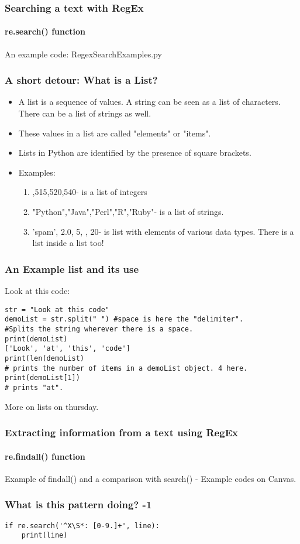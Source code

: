 \documentclass{beamer}
\begin{document}
\begin{frame}
\frametitle{Searching a text with RegEx}
\framesubtitle{re.search() function}
An example code: RegexSearchExamples.py 
\end{frame}

\begin{frame}
\frametitle{A short detour: What is a List?}
\begin{itemize}
\item A list is a sequence of values. A string can be seen as a list of characters. There can be a list of strings as well.
\item These values in a list are called "elements" or "items".
\item Lists in Python are identified by the presence of square brackets. 
\item Examples:
\begin{enumerate}
\item {},515,520,540\rbrack - is a list of integers
\item \lbrack"Python","Java","Perl","R","Ruby"\rbrack - is a list of strings.
\item \lbrack'spam', 2.0, 5, , 20\rbrack\rbrack - is list with elements of various data types. There is a list inside a list too!
\end{enumerate}
\end{itemize}
\end{frame}

\begin{frame}[fragile]
\frametitle{An Example list and its use}
Look at this code:
\begin{verbatim}
str = "Look at this code"
demoList = str.split(" ") #space is here the "delimiter".
#Splits the string wherever there is a space.
print(demoList)
['Look', 'at', 'this', 'code']
print(len(demoList) 
# prints the number of items in a demoList object. 4 here.
print(demoList[1]) 
# prints "at".
\end{verbatim}

More on lists on thursday.
\end{frame}

\begin{frame}
\frametitle{Extracting information from a text using RegEx}
\framesubtitle{re.findall() function}
Example of findall() and a comparison with search() - Example codes on Canvas.
\end{frame}

\begin{frame}[fragile]
\frametitle{What is this pattern doing? -1}
\begin{verbatim}
if re.search('^X\S*: [0-9.]+', line):
    print(line)
\end{verbatim}
\pause
\end{frame}
\end{document}
